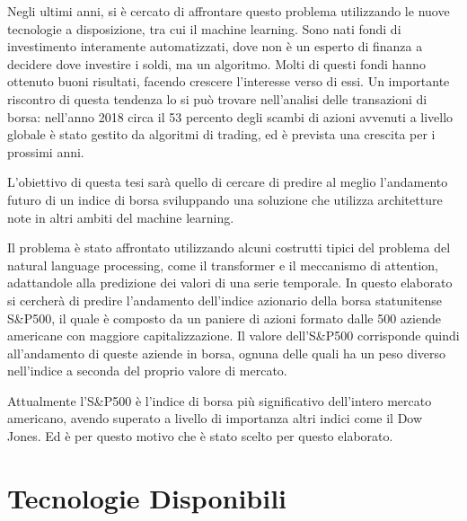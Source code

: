 \documentclass[12pt,a4paper,twoside,openright]{book}
\begin{document}
Negli ultimi anni, si è cercato di affrontare questo problema utilizzando le nuove tecnologie a disposizione, tra cui il machine learning.
Sono nati fondi di investimento interamente automatizzati, dove non è un esperto di finanza a decidere dove investire i soldi, ma un algoritmo. Molti di questi fondi hanno ottenuto buoni risultati, facendo crescere l’interesse verso di essi.
Un importante riscontro di questa tendenza lo si può trovare nell’analisi delle transazioni di borsa: nell’anno 2018 circa il 53 percento degli scambi di azioni avvenuti a livello globale è stato gestito da algoritmi di trading, ed è prevista una crescita per i prossimi anni.

L’obiettivo di questa tesi sarà quello di cercare di predire al meglio l'andamento futuro di un indice di borsa sviluppando una soluzione che utilizza architetture note in altri ambiti del machine learning.

Il problema è stato affrontato utilizzando alcuni costrutti tipici del problema del natural language processing, come il transformer e il meccanismo di attention, adattandole alla predizione dei valori di una serie temporale.
In questo elaborato si cercherà di predire l'andamento dell’indice azionario della borsa statunitense S\&P500, il quale è composto da un paniere di azioni formato dalle 500 aziende americane con maggiore capitalizzazione. Il valore dell'S\&P500 corrisponde quindi all’andamento di queste aziende in borsa, ognuna delle quali ha un peso diverso nell’indice a seconda del proprio valore di mercato.

Attualmente l'S\&P500 è l’indice di borsa più significativo dell’intero mercato americano, avendo superato a livello di importanza altri indici come il Dow Jones. Ed è per questo motivo che è stato scelto per questo elaborato.

\newpage

\tableofcontents

\newpage

\listoffigures

\mainmatter

\pagestyle{fancy} 
\fancyhead[LO]{\nouppercase{\rightmark}}
\fancyhead[RE]{\nouppercase{\leftmark}}
\fancyhead[LE,RO]{\thepage}
\fancyfoot{}



\chapter{Tecnologie Disponibili}
\end{document}
